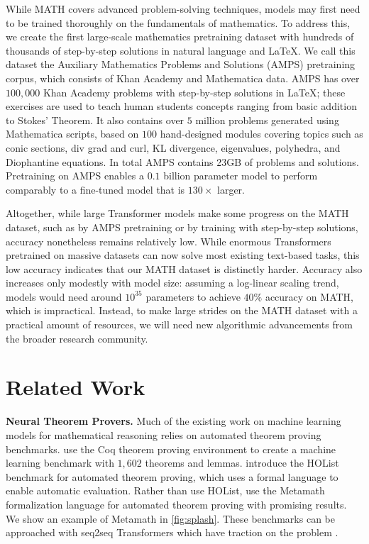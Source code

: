While MATH covers advanced problem-solving techniques, models may first need to be trained thoroughly on the fundamentals of mathematics. To address this, we create the first large-scale mathematics pretraining dataset with hundreds of thousands of step-by-step solutions in natural language and \LaTeX{}.
We call this dataset the Auxiliary Mathematics Problems and Solutions (AMPS) pretraining corpus, which consists of Khan Academy and Mathematica data. AMPS has over $100,000$ Khan Academy problems with step-by-step solutions in \LaTeX{}; these exercises are used to teach human students concepts ranging from basic addition to Stokes' Theorem. It also contains over $5$ million problems generated using Mathematica scripts, based on $100$ hand-designed modules covering topics such as conic sections, div grad and curl, KL divergence, eigenvalues, polyhedra, and Diophantine equations. In total AMPS contains 23GB of problems and solutions. Pretraining on AMPS enables a $0.1$ billion parameter model to perform comparably to a fine-tuned model that is $130\times$ larger.

Altogether, while large Transformer models \citep{Vaswani2017AttentionIA} make some progress on the MATH dataset, such as by AMPS pretraining or by training with step-by-step solutions, accuracy nonetheless remains relatively low. While enormous Transformers pretrained on massive datasets can now solve most existing text-based tasks, this low accuracy indicates that our MATH dataset is distinctly harder. Accuracy also increases only modestly with model size: assuming a log-linear scaling trend, models would need around $10^{35}$ parameters to achieve $40\%$ accuracy on MATH, which is impractical. Instead, to make large strides on the MATH dataset with a practical amount of resources, we will need new algorithmic advancements from the broader research community.

\section{Related Work}

\textbf{Neural Theorem Provers.}\quad
Much of the existing work on machine learning models for mathematical reasoning relies on automated theorem proving benchmarks.
\citet{Huang2019GamePadAL} use the Coq theorem proving environment to create a machine learning benchmark with $1,602$ theorems and lemmas. \citet{Bansal2019HOListAE} introduce the HOList benchmark for automated theorem proving, which uses a formal language to enable automatic evaluation. Rather than use HOList, \citet{Polu2020GenerativeLM} use the Metamath formalization language for automated theorem proving with promising results. We show an example of Metamath in \ref{fig:splash}. These benchmarks can be approached with seq2seq \citep{Sutskever2014SequenceTS} Transformers which have traction on the problem \citep{Polu2020GenerativeLM, Rabe2020MathematicalRV, Li2020ModellingHM}.

